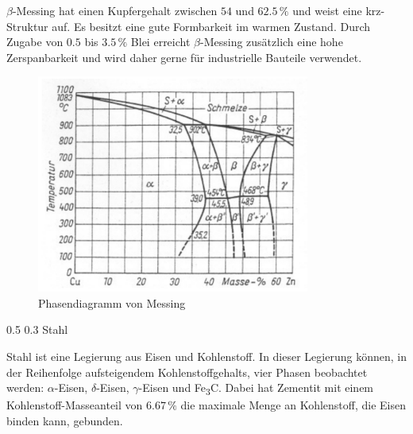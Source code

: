\documentclass[german, %
parskip=full, %
bibliography=totoc, %
]{scrartcl}
\makeatletter
\renewcommand\subsection{\@startsection 
   {subsection}{2}{0mm}%
   {0.5\baselineskip}%
   {0.3\baselineskip}%
   {\bfseries\sffamily\large}%
   }
\makeatother
\begin{document}
$\beta$-Messing hat einen Kupfergehalt zwischen $54$ und $62.5\,\%$ und weist eine krz-Struktur auf. Es besitzt eine gute Formbarkeit im warmen Zustand. Durch Zugabe von $0.5$ bis $3.5\,\%$ Blei erreicht $\beta$-Messing zusätzlich eine hohe Zerspanbarkeit und wird daher gerne für industrielle Bauteile verwendet.

\begin{figure}[hb] 
  \centering
     \includegraphics[width=0.8\textwidth]{Messing_Phase}
  \caption{Phasendiagramm von Messing}
  \label{fig:phasemessing}
\end{figure}

\subsection{Stahl}

Stahl ist eine Legierung aus Eisen und Kohlenstoff. In dieser Legierung können, in der Reihenfolge aufsteigendem Kohlenstoffgehalts, vier Phasen beobachtet werden: $\alpha$-Eisen, $\delta$-Eisen, $\gamma$-Eisen und Fe\textsubscript{3}C. Dabei hat Zementit mit einem Kohlenstoff-Masseanteil von $6.67\,\%$ die maximale Menge an Kohlenstoff, die Eisen binden kann, gebunden. 
\end{document}
